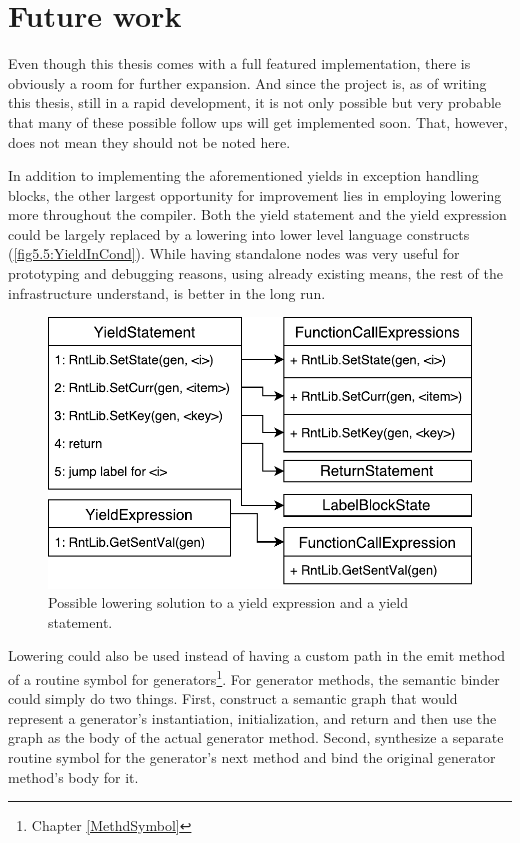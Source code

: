 \section{Future work}

Even though this thesis comes with a full featured implementation, there is obviously a room for further expansion. And since the project is, as of writing this thesis, still in a rapid development, it is not only possible but very probable that many of these possible follow ups will get implemented soon. That, however, does not mean they should not be noted here.

In addition to implementing the aforementioned yields in exception handling blocks, the other largest opportunity for improvement lies in employing lowering more throughout the compiler. Both the yield statement and the yield expression could be largely replaced by a lowering into lower level language constructs (\autoref{fig5.5:YieldInCond}). While having standalone nodes was very useful for prototyping and debugging reasons, using already existing means, the rest of the infrastructure understand, is better in the long run. 

\begin{figure}[h]
	\centering	
	\includegraphics[scale=0.75]{../img/6_6_yieldLowering}	
	\caption{Possible lowering solution to a yield expression and a yield statement.}
	\label{fig5.5:YieldInCond}
\end{figure}

Lowering could also be used instead of having a custom path in the emit method of a routine symbol for generators\footnote{Chapter \ref{MethdSymbol}}. For generator methods, the semantic binder could simply do two things. First, construct a semantic graph that would represent a generator’s instantiation, initialization, and return and then use the graph as the body of the actual generator method. Second, synthesize a separate routine symbol for the generator's next method and bind the original generator method’s body for it.

